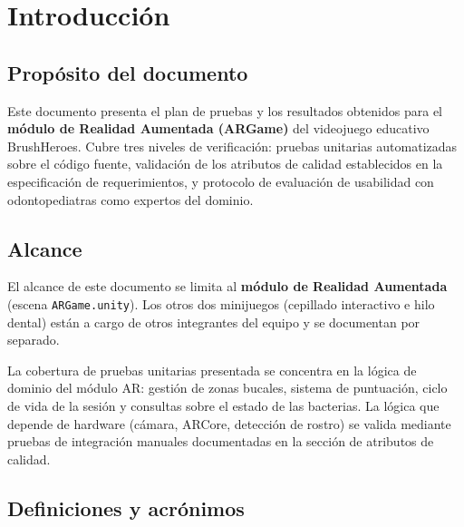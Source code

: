 \documentclass[12pt, a4paper]{article}
\begin{document}
\section{Introducción}

\subsection{Propósito del documento}

Este documento presenta el plan de pruebas y los resultados obtenidos para el
\textbf{módulo de Realidad Aumentada (ARGame)} del videojuego educativo
BrushHeroes. Cubre tres niveles de verificación: pruebas unitarias automatizadas
sobre el código fuente, validación de los atributos de calidad establecidos en
la especificación de requerimientos, y protocolo de evaluación de usabilidad
con odontopediatras como expertos del dominio.

\subsection{Alcance}

El alcance de este documento se limita al \textbf{módulo de Realidad Aumentada}
(escena \texttt{ARGame.unity}). Los otros dos minijuegos (cepillado interactivo
e hilo dental) están a cargo de otros integrantes del equipo y se documentan
por separado.

\begin{notebox}
La cobertura de pruebas unitarias presentada se concentra en la lógica de
dominio del módulo AR: gestión de zonas bucales, sistema de puntuación,
ciclo de vida de la sesión y consultas sobre el estado de las bacterias.
La lógica que depende de hardware (cámara, ARCore, detección de rostro)
se valida mediante pruebas de integración manuales documentadas en la
sección de atributos de calidad.
\end{notebox}

\subsection{Definiciones y acrónimos}
\end{document}
